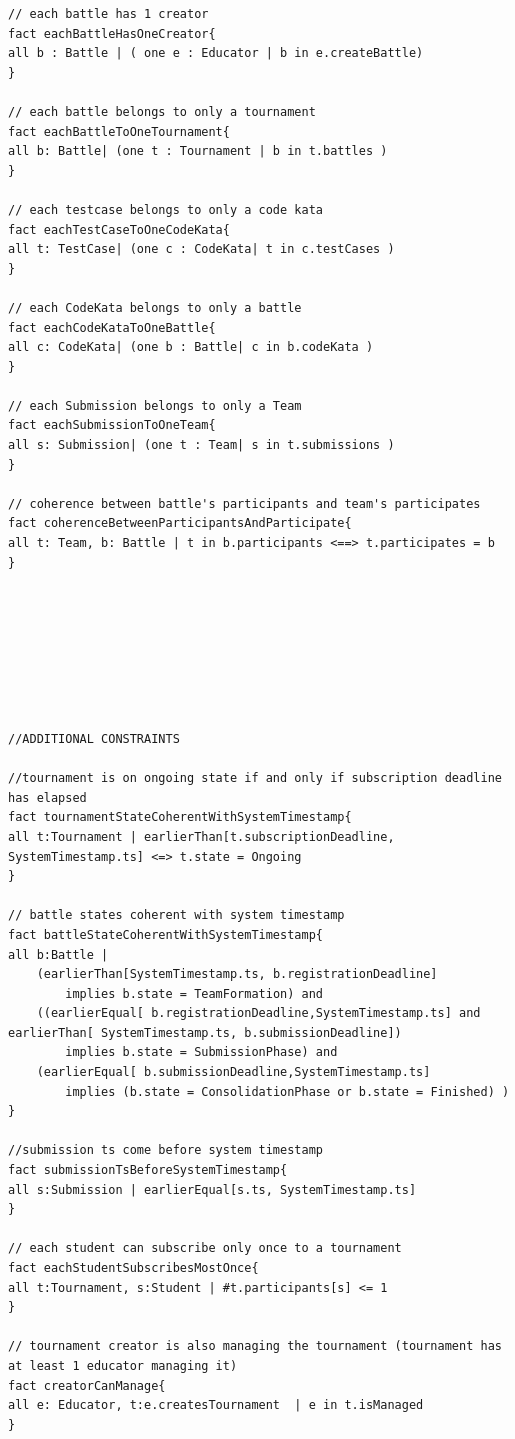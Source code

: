 \begin{lstlisting}[language=alloy]
// each battle has 1 creator
fact eachBattleHasOneCreator{
all b : Battle | ( one e : Educator | b in e.createBattle)
}

// each battle belongs to only a tournament
fact eachBattleToOneTournament{
all b: Battle| (one t : Tournament | b in t.battles )
}

// each testcase belongs to only a code kata
fact eachTestCaseToOneCodeKata{
all t: TestCase| (one c : CodeKata| t in c.testCases )
}

// each CodeKata belongs to only a battle
fact eachCodeKataToOneBattle{
all c: CodeKata| (one b : Battle| c in b.codeKata )
}

// each Submission belongs to only a Team
fact eachSubmissionToOneTeam{
all s: Submission| (one t : Team| s in t.submissions )
}

// coherence between battle's participants and team's participates
fact coherenceBetweenParticipantsAndParticipate{
all t: Team, b: Battle | t in b.participants <==> t.participates = b
}








//ADDITIONAL CONSTRAINTS

//tournament is on ongoing state if and only if subscription deadline has elapsed
fact tournamentStateCoherentWithSystemTimestamp{
all t:Tournament | earlierThan[t.subscriptionDeadline, SystemTimestamp.ts] <=> t.state = Ongoing
}

// battle states coherent with system timestamp
fact battleStateCoherentWithSystemTimestamp{
all b:Battle | 
    (earlierThan[SystemTimestamp.ts, b.registrationDeadline] 
        implies b.state = TeamFormation) and
    ((earlierEqual[ b.registrationDeadline,SystemTimestamp.ts] and earlierThan[ SystemTimestamp.ts, b.submissionDeadline]) 
        implies b.state = SubmissionPhase) and
    (earlierEqual[ b.submissionDeadline,SystemTimestamp.ts] 
        implies (b.state = ConsolidationPhase or b.state = Finished) )
}

//submission ts come before system timestamp
fact submissionTsBeforeSystemTimestamp{
all s:Submission | earlierEqual[s.ts, SystemTimestamp.ts]
}

// each student can subscribe only once to a tournament
fact eachStudentSubscribesMostOnce{
all t:Tournament, s:Student | #t.participants[s] <= 1
}

// tournament creator is also managing the tournament (tournament has at least 1 educator managing it)
fact creatorCanManage{ 
all e: Educator, t:e.createsTournament  | e in t.isManaged 
}


\end{lstlisting}
